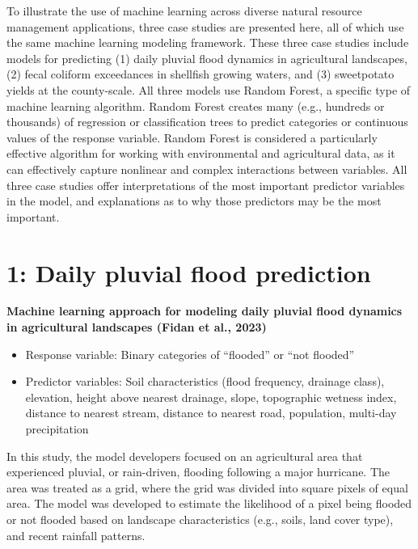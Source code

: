 \documentclass[
]{book}
\providecommand{\tightlist}{%
  \setlength{\itemsep}{0pt}\setlength{\parskip}{0pt}}
\begin{document}
To illustrate the use of machine learning across diverse natural resource management applications, three case studies are presented here, all of which use the same machine learning modeling framework. These three case studies include models for predicting (1) daily pluvial flood dynamics in agricultural landscapes, (2) fecal coliform exceedances in shellfish growing waters, and (3) sweetpotato yields at the county-scale. All three models use Random Forest, a specific type of machine learning algorithm. Random Forest creates many (e.g., hundreds or thousands) of regression or classification trees to predict categories or continuous values of the response variable. Random Forest is considered a particularly effective algorithm for working with environmental and agricultural data, as it can effectively capture nonlinear and complex interactions between variables. All three case studies offer interpretations of the most important predictor variables in the model, and explanations as to why those predictors may be the most important.

\hypertarget{daily-pluvial-flood-prediction}{%
\section{1: Daily pluvial flood prediction}\label{daily-pluvial-flood-prediction}}

\textbf{Machine learning approach for modeling daily pluvial flood dynamics in agricultural landscapes (Fidan et al., 2023)}

\begin{itemize}
\tightlist
\item
  Response variable: Binary categories of ``flooded'' or ``not flooded''
\item
  Predictor variables: Soil characteristics (flood frequency, drainage class), elevation, height above nearest drainage, slope, topographic wetness index, distance to nearest stream, distance to nearest road, population, multi-day precipitation
\end{itemize}

In this study, the model developers focused on an agricultural area that experienced pluvial, or rain-driven, flooding following a major hurricane. The area was treated as a grid, where the grid was divided into square pixels of equal area. The model was developed to estimate the likelihood of a pixel being flooded or not flooded based on landscape characteristics (e.g., soils, land cover type), and recent rainfall patterns.
\end{document}
